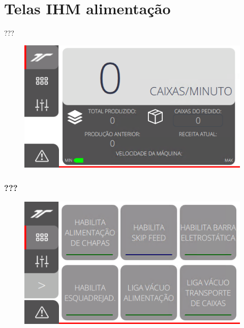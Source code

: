 \thispagestyle{fancy}
\vspace*{\fill}
\section{Telas IHM alimentação}
 ???
\begin{figure}[h]
  \centering
  \includegraphics{src/imagesFlexo/11-IHMALM/e-1.png}
\end{figure}
\vspace*{\fill}

\newpage
\thispagestyle{fancy}
\vspace*{\fill}
\subsubsection{\small{???}}
\begin{figure}[h]
  \centering
  \includegraphics{src/imagesFlexo/11-IHMALM/e-2.png}
\end{figure}
\vspace*{\fill}

\newpage
\thispagestyle{fancy}
\vspace*{\fill}
